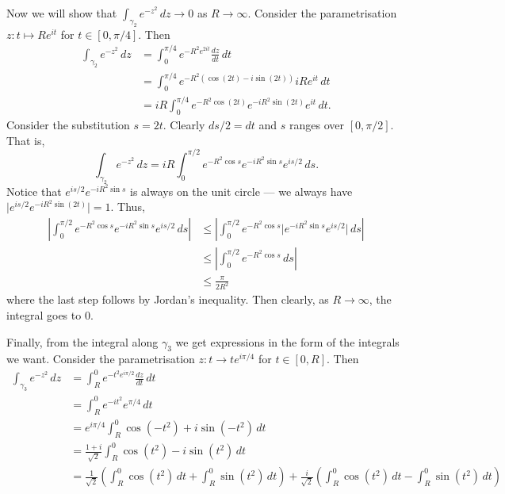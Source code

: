 \documentclass[12 pt, letterpaper]{hmcpset}
\begin{document}
\begin{solution}
	Now we will show that $\int_{\gamma_{2}} e^{-z^{2}} \, dz \to 0$ as $R \to \infty$. Consider the parametrisation $z : t \mapsto R e^{i t}$	for $t \in [0, \pi / 4]$. Then
	\[
		\begin{split}
			\int_{\gamma_{2}} e^{-z^{2}} \, dz & = \int_{0}^{\pi / 4} e^{- R^{2} e^{2 i t}} \frac{dz}{dt} \, dt \\
							  & = \int_{0}^{\pi / 4} e^{- R^{2}(\cos{(2t)} - i \sin{(2t)})} iR e^{it} \, dt \\
							  & = iR \int_{0}^{\pi / 4} e^{- R^{2} \cos{(2t)}} e^{- i R^{2} \sin{(2t)}} e^{it} \, dt.
		\end{split}
	\]
	Consider the substitution $s = 2t$. Clearly $ds/2 = dt$ and $s$ ranges over $[0, \pi / 2]$. That is,
	\[
		\int_{\gamma_{2}} e^{-z^{2}} \, dz = iR \int_{0}^{\pi / 2} e^{- R^{2} \cos{s}} e^{- i R^{2} \sin{s}} e^{i s/2} \, ds.
	\]
	Notice that $e^{is/2} e^{- i R^{2} \sin{s}}$ is always on the unit circle --- we always have $\lvert e^{i s/2} e^{- i R^{2} \sin{(2t)}} \rvert = 1$. Thus,
	\[
		\begin{split}
			\left \lvert \int_{0}^{\pi / 2} e^{- R^{2} \cos{s}} e^{- i R^{2} \sin{s}} e^{i s/2} \, ds  \right \rvert & \le \left \lvert \int_{0}^{\pi/2} e^{- R^{2} \cos{s}} \lvert e^{-i R^{2} \sin{s}} e^{is/2} \rvert \, ds  \right \rvert \\
			& \le \left \lvert \int_{0}^{\pi / 2} e^{- R^{2} \cos{s}} \, ds  \right \rvert \\
			& \le \frac{\pi}{2 R^{2}}
		\end{split}
	\]
	where the last step follows by Jordan's inequality. Then clearly, as $R \to \infty$, the integral goes to $0$.

	Finally, from the integral along $\gamma_{3}$ we get expressions in the form of the integrals we want. Consider the parametrisation $z : t \to t e^{i \pi /4}$ for $t \in [0, R]$. Then
	\[
		 \begin{split}
			 \int_{\gamma_{3}} e^{-z^{2}} \, dz & = \int_{R}^{0} e^{- t^{2} e^{i \pi / 2}} \frac{dz}{dt} \, dt \\
							    & = \int_{R}^{0} e^{- i t^{2}} e^{\pi / 4} \, dt \\
							    & = e^{i \pi / 4} \int_{R}^{0} \cos{(- t^{2})} + i \sin{(- t^{2})}  \, dt \\
							    & = \frac{1 + i}{\sqrt{2}} \int_{R}^{0} \cos{(t^{2})} - i \sin{(t^{2})} \, dt \\
							    & = \frac{1}{\sqrt{2}} \left ( \int_{R}^{0} \cos{(t^{2})} \, dt + \int_{R}^{0} \sin{(t^{2})} \, dt  \right ) + \frac{i}{\sqrt{2}} \left ( \int_{R}^{0} \cos{(t^{2})} \, dt - \int_{R}^{0} \sin{(t^{2})} \, dt   \right )
		 \end{split}
	\]
	

\end{solution}
\end{document}
